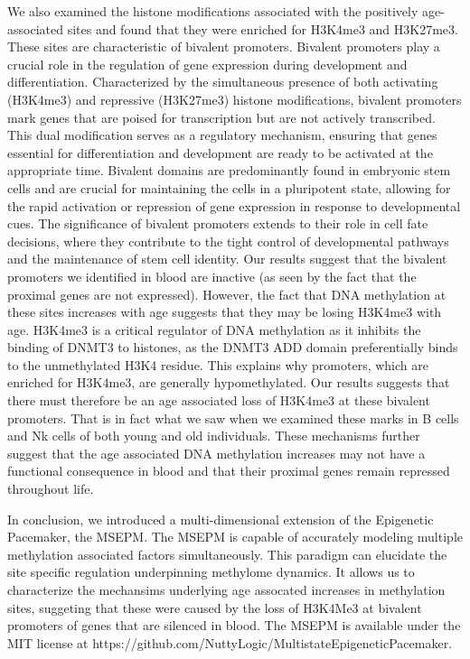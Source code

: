 \documentclass[sn-nature]{sn-jnl}
\begin{document}
{\begin{linenumbers}
We also examined the histone modifications associated with the positively age-associated sites and found that they were 
enriched for H3K4me3 and H3K27me3.  These sites are characteristic of bivalent promoters.  Bivalent promoters play a 
crucial role in the regulation of gene expression during development and differentiation. Characterized by the simultaneous 
presence of both activating (H3K4me3) and repressive (H3K27me3) histone modifications, bivalent promoters mark genes that 
are poised for transcription but are not actively transcribed. This dual modification serves as a regulatory mechanism, 
ensuring that genes essential for differentiation and development are ready to be activated at the appropriate time. 
Bivalent domains are predominantly found in embryonic stem cells and are crucial for maintaining the cells in a 
pluripotent state, allowing for the rapid activation or repression of gene expression in response to developmental 
cues. The significance of bivalent promoters extends to their role in cell fate decisions, where they contribute 
to the tight control of developmental pathways and the maintenance of stem cell identity\cite{Bernstein2006-wt,Voigt2013-fe}. 
Our results suggest that the bivalent promoters we identified in blood are inactive (as seen by the fact that the proximal genes are not expressed). 
However, the fact that DNA methylation at these sites increases with age suggests that they may be losing H3K4me3 with age. H3K4me3 is a critical 
regulator of DNA methylation as it inhibits the binding of DNMT3 to histones, as the DNMT3 ADD domain preferentially binds to the unmethylated 
H3K4 residue\cite{Ooi2007-dw}.  This explains why promoters, which are enriched for H3K4me3, are generally hypomethylated.  Our results 
suggests that there must therefore be an age associated loss of H3K4me3 at these bivalent promoters. That is in fact what we saw when we
 examined these marks in B cells and Nk cells of both young and old individuals.  These mechanisms further suggest that the age 
 associated DNA methylation increases may not have a functional consequence in blood and that their proximal genes remain repressed throughout life.

In conclusion, we introduced a multi-dimensional extension of the Epigenetic Pacemaker, the MSEPM. The MSEPM is capable of 
accurately modeling multiple methylation associated factors simultaneously. This paradigm can elucidate the site specific 
regulation underpinning methylome dynamics. It allows us to characterize the mechansims underlying age assocated increases 
in methylation sites, suggeting that these were caused by the loss of H3K4Me3 at bivalent promoters of genes that are silenced 
in blood.  The MSEPM is available under the MIT license at https://github.com/NuttyLogic/MultistateEpigeneticPacemaker. 


\end{linenumbers}}
\end{document}

